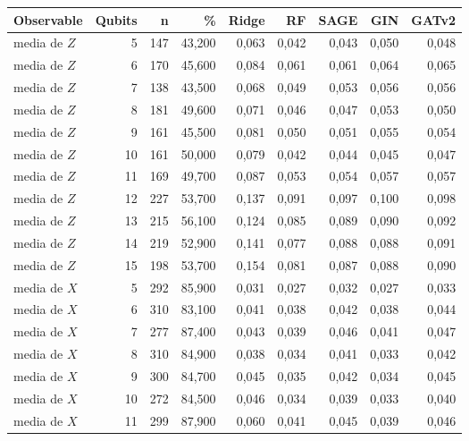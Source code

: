 \begin{table}[htbp]
    \centering
    {\footnotesize
    \begin{tabular}{@{}lrrrrrrrr@{}}
        \toprule
        \textbf{Observable} & \textbf{Qubits} & \textbf{n} & \textbf{\%} & \textbf{Ridge} & \textbf{RF} & \textbf{SAGE} & \textbf{GIN} & \textbf{GATv2} \\
        \midrule
        media de $Z$ & 5 & 147 & 43,200 & 0,063 & 0,042 & 0,043 & 0,050 & 0,048 \\
        media de $Z$ & 6 & 170 & 45,600 & 0,084 & 0,061 & 0,061 & 0,064 & 0,065 \\
        media de $Z$ & 7 & 138 & 43,500 & 0,068 & 0,049 & 0,053 & 0,056 & 0,056 \\
        media de $Z$ & 8 & 181 & 49,600 & 0,071 & 0,046 & 0,047 & 0,053 & 0,050 \\
        media de $Z$ & 9 & 161 & 45,500 & 0,081 & 0,050 & 0,051 & 0,055 & 0,054 \\
        media de $Z$ & 10 & 161 & 50,000 & 0,079 & 0,042 & 0,044 & 0,045 & 0,047 \\
        media de $Z$ & 11 & 169 & 49,700 & 0,087 & 0,053 & 0,054 & 0,057 & 0,057 \\
        media de $Z$ & 12 & 227 & 53,700 & 0,137 & 0,091 & 0,097 & 0,100 & 0,098 \\
        media de $Z$ & 13 & 215 & 56,100 & 0,124 & 0,085 & 0,089 & 0,090 & 0,092 \\
        media de $Z$ & 14 & 219 & 52,900 & 0,141 & 0,077 & 0,088 & 0,088 & 0,091 \\
        media de $Z$ & 15 & 198 & 53,700 & 0,154 & 0,081 & 0,087 & 0,088 & 0,090 \\
        media de $X$ & 5 & 292 & 85,900 & 0,031 & 0,027 & 0,032 & 0,027 & 0,033 \\
        media de $X$ & 6 & 310 & 83,100 & 0,041 & 0,038 & 0,042 & 0,038 & 0,044 \\
        media de $X$ & 7 & 277 & 87,400 & 0,043 & 0,039 & 0,046 & 0,041 & 0,047 \\
        media de $X$ & 8 & 310 & 84,900 & 0,038 & 0,034 & 0,041 & 0,033 & 0,042 \\
        media de $X$ & 9 & 300 & 84,700 & 0,045 & 0,035 & 0,042 & 0,034 & 0,045 \\
        media de $X$ & 10 & 272 & 84,500 & 0,046 & 0,034 & 0,039 & 0,033 & 0,040 \\
        media de $X$ & 11 & 299 & 87,900 & 0,060 & 0,041 & 0,045 & 0,039 & 0,046 \\

\end{tabular}}
\end{table}

